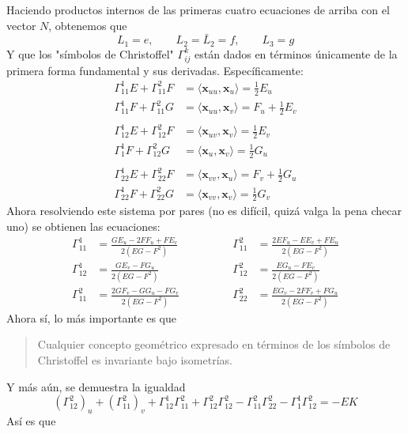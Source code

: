 \documentclass[spanish]{book}
\theoremstyle{definition}
\begin{document}
Haciendo productos internos de las primeras cuatro ecuaciones de arriba con el vector $N$, obtenemos que 
\[L_1=e,\qquad L_2=\bar L_2=f,\qquad L_3=g\]
Y que los "símbolos de Christoffel" $\Gamma^k_{ij}$ están dados en términos únicamente de la primera forma fundamental y sus derivadas. Específicamente:
\begin{align*}
	\Gamma^1_{11}E+\Gamma^2_{11}F&=\langle \mathbf x_{uu},\mathbf x_u\rangle=\frac{1}{2}E_u\\
	\Gamma^1_{11}F+\Gamma^2_{11}G&=\langle \mathbf x_{uu},\mathbf x_v\rangle=F_u+\frac{1}{2}E_v\\\\
	\Gamma^1_{12}E+\Gamma^2_{12}F&=\langle \mathbf x_{uv},\mathbf x_v\rangle=\frac{1}{2}E_v\\
	\Gamma^1_{1}F+\Gamma^2_{12}G&=\langle \mathbf x_{u},\mathbf x_v\rangle=\frac{1}{2}G_u\\ \\
	\Gamma^1_{22}E+\Gamma^2_{22}F&=\langle \mathbf x_{vv},\mathbf x_u\rangle=F_v+\frac{1}{2}G_u\\
	\Gamma^1_{22}F+\Gamma^2_{22}G&=\langle \mathbf x_{vv},\mathbf x_v\rangle=\frac{1}{2}G_v
\end{align*}
Ahora resolviendo este sistema por pares (no es difícil, quizá valga la pena checar uno) se obtienen las ecuaciones:
\[\begin{split}
	\Gamma^1_{11}&=\frac{GE_u-2FF_u+FE_v}{2(EG-F^2)}\\
	\Gamma^1_{12}&=\frac{GE_v-FG_u}{2(EG-F^2)}\\
	\Gamma^2_{11}&=\frac{2GF_v-GG_u-FG_v}{2(EG-F^2)}
\end{split}
\begin{split}
	\qquad\qquad\Gamma^2_{11}&=\frac{2EF_u-EE_v+FE_u}{2(EG-F^2)}\\
	\qquad\qquad \Gamma^2_{12}&=\frac{EG_u-FE_v}{2(EG-F^2)}\\
	\qquad\qquad\Gamma^2_{22}&=\frac{EG_v-2FF_v+FG_u}{2(EG-F^2)}
\end{split}\]
Ahora sí, lo más importante es que
\begin{quote}
	Cualquier concepto geométrico expresado en términos de los símbolos de Christoffel es invariante bajo isometrías.
\end{quote}
Y más aún, se demuestra la igualdad
\[(\Gamma^2_{12})_u+(\Gamma^2_{11})_v+\Gamma^1_{12}\Gamma^2_{11}+\Gamma^2_{12}\Gamma^2_{12}-\Gamma^2_{11}\Gamma^2_{22}-\Gamma^1_{1}\Gamma^2_{12}=-EK\]
Así es que 
\end{document}
